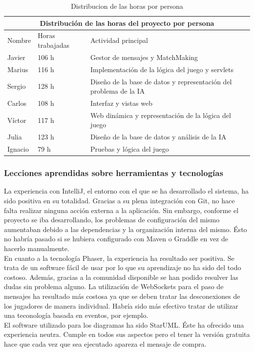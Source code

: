 \begin{table}[htb]
\centering
\begin{tabular}{|l|l|l|}
\hline
\multicolumn{3}{|c|}{Distribución de las horas del proyecto por persona} \\ \hline
	Nombre & Horas trabajadas & Actividad principal \\ \hline
	Javier & 106 h & Gestor de mensajes y MatchMaking \\ \hline
	Marius & 116 h & Implementación de la lógica del juego y servlets \\ \hline
	Sergio & 128 h & Diseño de la base de datos y representación del problema de la IA \\ \hline
	Carlos & 108 h & Interfaz y vistas web \\ \hline
	Víctor & 117 h & Web dinámica y representación de la lógica del juego \\ \hline
	Julia  & 123 h & Diseño de la base de datos y análisis de la IA \\ \hline
	Ignacio & 79 h & Pruebas y lógica del juego \\ \hline
 \end{tabular}
 \caption{Distribucion de las horas por persona}
\label{}
\end{table}

\subsubsection{Lecciones aprendidas sobre herramientas y tecnologías}
La experiencia con IntelliJ, el entorno con el que se ha desarrollado el sistema, ha sido positiva en su totalidad. Gracias a su plena integración con Git, no hace falta realizar ninguna acción externa a la aplicación. Sin embargo, conforme el proyecto se iba desarrollando, los problemas de configuración del mismo aumentaban debido a las dependencias y la organización interna del mismo. Ésto no habría pasado si se hubiera configurado con Maven o Graddle en vez de hacerlo manualmente.
\\
En cuanto a la tecnología Phaser, la experiencia ha resultado ser positiva. Se trata de un software fácil de usar por lo que su aprendizaje no ha sido del todo costoso. Además, gracias a la comunidad disponible se han podido resulver las dudas sin problema alguno. La utilización de WebSockets para el paso de mensajes ha resultado más costosa ya que se deben tratar las desconexiones de los jugadores de manera individual. Habría sido más efectivo tratar de utilizar una teconología basada en eventos, por ejemplo.
\\
El software utilizado para los diagramas ha sido StarUML. Éste ha ofrecido una experiencia neutra. Cumple en todos sus aspectos pero el tener la versión gratuita hace que cada vez que sea ejecutado apareza el mensaje de compra.
